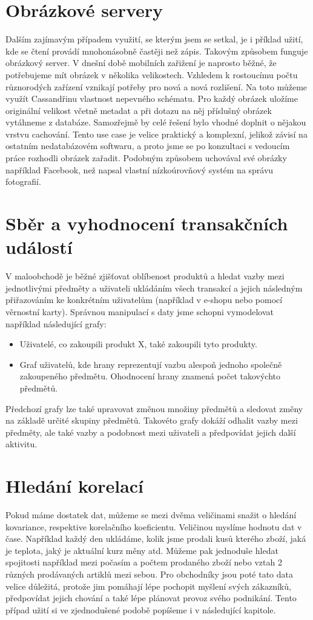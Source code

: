 \section{Obrázkové servery}
Dalším zajímavým případem využití, se kterým jsem se setkal, je i příklad užití, kde se čtení provádí mnohonásobně častěji než zápis. Takovým způsobem funguje obrázkový server. V dnešní době mobilních zařižení je naprosto běžné, že potřebujeme mít obrázek v několika velikostech. Vzhledem k rostoucímu počtu různorodých zařízení vznikají potřeby pro nová a nová rozlišení. Na toto můžeme využít Cassandřinu vlastnost nepevného schématu. Pro každý obrázek uložíme originální velikost včetně metadat a při dotazu na něj příslušný obrázek vytáhneme z databáze. Samozřejmě by celé řešení bylo vhodné doplnit o nějakou vrstvu cachování. Tento use case je velice praktický a komplexní, jelikož závisí na ostatním nedatabázovém softwaru, a proto jsme se po konzultaci s vedoucím práce rozhodli obrázek zařadit. Podobným způsobem uchovával své obrázky například Facebook, než napsal vlastní nízkoúrovňový systém na správu fotografií. 

\section{Sběr a vyhodnocení transakčních událostí}
V maloobchodě je běžné zjišťovat oblíbenost produktů a hledat vazby mezi jednotlivými předměty a uživateli ukládáním všech transakcí a jejich následným přiřazováním ke konkrétním uživatelům (například v e-shopu nebo pomocí věrnostní karty). Správnou manipulací s daty jsme schopni vymodelovat například následující grafy:

\begin{itemize}
\item Uživatelé, co zakoupili produkt X, také zakoupili tyto produkty.
\item Graf uživatelů, kde hrany reprezentují vazbu alespoň jednoho společně zakoupeného předmětu. Ohodnocení hrany znamená počet takovýchto předmětů. 
\end{itemize} 
Předchozí grafy lze také upravovat změnou množiny předmětů a sledovat změny na základě určité skupiny předmětů. Takovéto grafy dokáží odhalit vazby mezi předměty, ale také vazby a podobnost mezi uživateli a předpovídat jejich další aktivitu. 
\newpage
\section{Hledání korelací}
Pokud máme dostatek dat, můžeme se mezi dvěma veličinami snažit o hledání kovariance, respektive korelačního koeficientu. Veličinou myslíme hodnotu dat v čase. Například každý den ukládáme, kolik jsme prodali kusů kterého zboží, jaká je teplota, jaký je aktuální kurz měny atd. Můžeme pak jednoduše hledat spojitosti například mezi počasím a počtem prodaného zboží nebo vztah 2 různých prodávaných artiklů mezi sebou. Pro obchodníky jsou poté tato data velice důležitá, protože jim pomáhají lépe pochopit myšlení svých zákazníků, předpovídat jejich chování a také lépe plánovat provoz svého podnikání. Tento případ užití si ve zjednodušené podobě popíšeme i v následující kapitole. 

